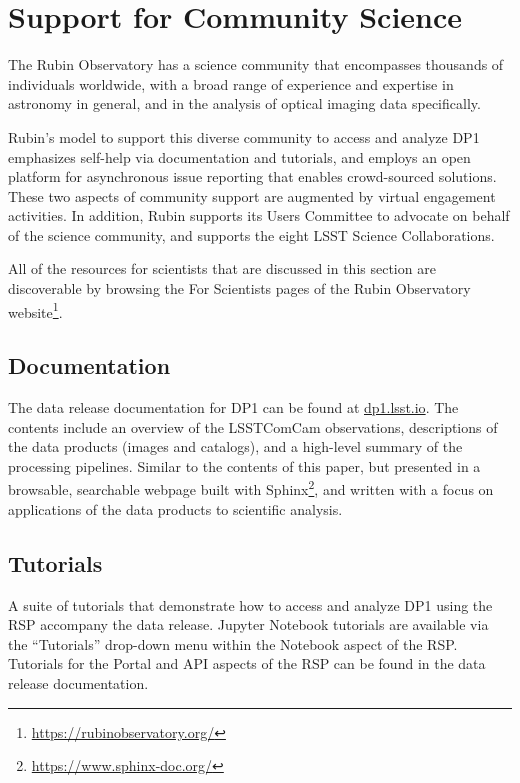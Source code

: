 \section{Support for Community Science
\label{sec:community_science}}

The Rubin Observatory has a science community that encompasses thousands of individuals worldwide, with a broad range of experience and expertise in astronomy in general, and in the analysis of optical imaging data specifically.

Rubin's model to support this diverse community to access and analyze DP1 emphasizes self-help via documentation and tutorials, and employs an open platform for asynchronous issue reporting that enables crowd-sourced solutions.
These two aspects of community support are augmented by virtual engagement activities.
In addition, Rubin supports its Users Committee to advocate on behalf of the science community, and supports the eight LSST Science Collaborations.

All of the resources for scientists that are discussed in this section are discoverable by browsing the For Scientists pages of the Rubin Observatory website\footnote{\url{https://rubinobservatory.org/}}.

\subsection{Documentation
\label{ssec:documentation}}

The data release documentation for DP1 can be found at \url{dp1.lsst.io}.
The contents include an overview of the LSSTComCam observations, descriptions of the data products (images and catalogs), and a high-level summary of the processing pipelines.
Similar to the contents of this paper, but presented in a browsable, searchable webpage built with Sphinx\footnote{\url{https://www.sphinx-doc.org/}}, and written with a focus on applications of the data products to scientific analysis.

\subsection{Tutorials
\label{ssec:tutorials}}

A suite of tutorials that demonstrate how to access and analyze DP1 using the RSP accompany the data release.
Jupyter Notebook tutorials are available via the ``Tutorials'' drop-down menu within the Notebook aspect of the RSP.
Tutorials for the Portal and API aspects of the RSP can be found in the data release documentation.

